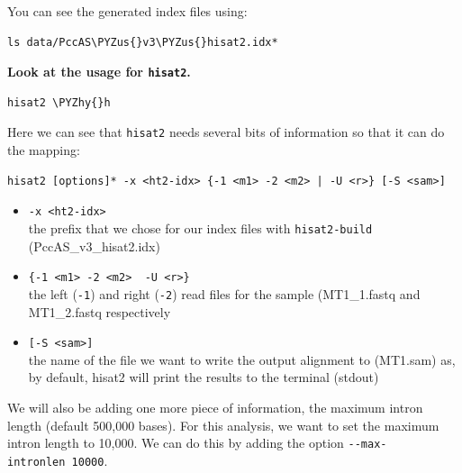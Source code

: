 \documentclass[11pt]{article}
\makeatletter
\def\PYZus{\char`\_}
\def\PYZhy{\char`\-}
\newcommand{\boxspacing}{\kern\kvtcb@left@rule\kern\kvtcb@boxsep}
\newcommand{\prompt}[4]{
        \ttfamily\llap{{\color{#2}[#3]:\hspace{3pt}#4}}\vspace{-\baselineskip}
    }
\makeatother
\begin{document}
    You can see the generated index files using:

    \begin{tcolorbox}[breakable, size=fbox, boxrule=1pt, pad at break*=1mm,colback=cellbackground, colframe=cellborder]
\prompt{In}{incolor}{ }{\boxspacing}
\begin{Verbatim}[commandchars=\\\{\}]
ls data/PccAS\PYZus{}v3\PYZus{}hisat2.idx*
\end{Verbatim}
\end{tcolorbox}

    \textbf{Look at the usage for \texttt{hisat2}.}

    \begin{tcolorbox}[breakable, size=fbox, boxrule=1pt, pad at break*=1mm,colback=cellbackground, colframe=cellborder]
\prompt{In}{incolor}{ }{\boxspacing}
\begin{Verbatim}[commandchars=\\\{\}]
hisat2 \PYZhy{}h
\end{Verbatim}
\end{tcolorbox}

    Here we can see that \texttt{hisat2} needs several bits of information
so that it can do the mapping:

\begin{verbatim}
hisat2 [options]* -x <ht2-idx> {-1 <m1> -2 <m2> | -U <r>} [-S <sam>]
\end{verbatim}

\begin{itemize}
\item
  \texttt{-x\ \textless{}ht2-idx\textgreater{}}~\\
  the prefix that we chose for our index files with
  \texttt{hisat2-build} (PccAS\_v3\_hisat2.idx)
\item
  \texttt{\{-1\ \textless{}m1\textgreater{}\ -2\ \textless{}m2\textgreater{}\ \textbar{}\ -U\ \textless{}r\textgreater{}\}}~\\
  the left (\texttt{-1}) and right (\texttt{-2}) read files for the
  sample (MT1\_1.fastq and MT1\_2.fastq respectively
\item
  \texttt{{[}-S\ \textless{}sam\textgreater{}{]}}~\\
  the name of the file we want to write the output alignment to
  (MT1.sam) as, by default, hisat2 will print the results to the
  terminal (stdout)
\end{itemize}

We will also be adding one more piece of information, the maximum intron
length (default 500,000 bases). For this analysis, we want to set the
maximum intron length to 10,000. We can do this by adding the option
\texttt{-\/-max-intronlen\ 10000}.
\end{document}
